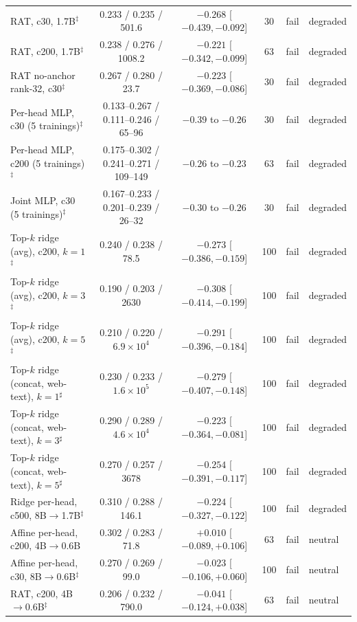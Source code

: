 \documentclass{article} %
\begin{document}
\begin{table}[t]
{\begin{tabular}{lccccl}
RAT, c30, 1.7B$^{\ddagger}$ & 0.233 / 0.235 / 501.6 & $-0.268$ [$-0.439, -0.092$] & 30 & fail & degraded \\
RAT, c200, 1.7B$^{\ddagger}$ & 0.238 / 0.276 / 1008.2 & $-0.221$ [$-0.342, -0.099$] & 63 & fail & degraded \\
RAT no-anchor rank-32, c30$^{\ddagger}$ & 0.267 / 0.280 / 23.7 & $-0.223$ [$-0.369, -0.086$] & 30 & fail & degraded \\
Per-head MLP, c30 (5 trainings)$^{\ddagger}$ & 0.133--0.267 / 0.111--0.246 / 65--96 & $-0.39$ to $-0.26$ & 30 & fail & degraded \\
Per-head MLP, c200 (5 trainings)$^{\ddagger}$ & 0.175--0.302 / 0.241--0.271 / 109--149 & $-0.26$ to $-0.23$ & 63 & fail & degraded \\
Joint MLP, c30 (5 trainings)$^{\ddagger}$ & 0.167--0.233 / 0.201--0.239 / 26--32 & $-0.30$ to $-0.26$ & 30 & fail & degraded \\
Top-$k$ ridge (avg), c200, $k{=}1$$^{\ddagger}$ & 0.240 / 0.238 / 78.5 & $-0.273$ [$-0.386, -0.159$] & 100 & fail & degraded \\
Top-$k$ ridge (avg), c200, $k{=}3$$^{\ddagger}$ & 0.190 / 0.203 / 2630 & $-0.308$ [$-0.414, -0.199$] & 100 & fail & degraded \\
Top-$k$ ridge (avg), c200, $k{=}5$$^{\ddagger}$ & 0.210 / 0.220 / $6.9\times10^{4}$ & $-0.291$ [$-0.396, -0.184$] & 100 & fail & degraded \\
Top-$k$ ridge (concat, web-text), $k{=}1$$^{\sharp}$ & 0.230 / 0.233 / $1.6\times10^{5}$ & $-0.279$ [$-0.407, -0.148$] & 100 & fail & degraded \\
Top-$k$ ridge (concat, web-text), $k{=}3$$^{\sharp}$ & 0.290 / 0.289 / $4.6\times10^{4}$ & $-0.223$ [$-0.364, -0.081$] & 100 & fail & degraded \\
Top-$k$ ridge (concat, web-text), $k{=}5$$^{\sharp}$ & 0.270 / 0.257 / 3678 & $-0.254$ [$-0.391, -0.117$] & 100 & fail & degraded \\
Ridge per-head, c500, 8B$\to$1.7B$^{\ddagger}$ & 0.310 / 0.288 / 146.1 & $-0.224$ [$-0.327, -0.122$] & 100 & fail & degraded \\
Affine per-head, c200, 4B$\to$0.6B & 0.302 / 0.283 / 71.8 & $+0.010$ [$-0.089, +0.106$] & 63 & fail & neutral \\
Affine per-head, c30, 8B$\to$0.6B$^{\ddagger}$ & 0.270 / 0.269 / 99.0 & $-0.023$ [$-0.106, +0.060$] & 100 & fail & neutral \\
RAT, c200, 4B$\to$0.6B$^{\ddagger}$ & 0.206 / 0.232 / 790.0 & $-0.041$ [$-0.124, +0.038$] & 63 & fail & neutral \\

\end{tabular}}
\end{table}
\end{document}
